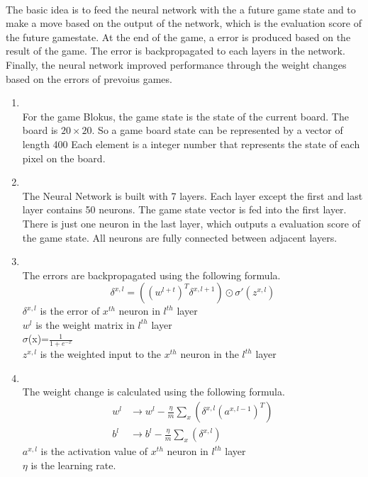 \documentclass{report}
\begin{document}
	\\
	The basic idea is to feed the neural network with the a future game state and to make a move based on the output of the network, which is the evaluation score of the future gamestate.
	At the end of the game, a error is produced based on the result of the game. The error is backpropagated to each layers in the network. Finally, the neural network improved performance through
	the weight changes based on the errors of prevoius games.
	\begin{enumerate}
		\item {}\\
			For the game Blokus, the game state is the state of the current board. The board is $20\times20$. So a game board state can be represented by a vector of length 400
			Each element is a integer number that represents the state of each pixel on the board. 
		\item {}\\
			The Neural Network is built with 7 layers. Each layer except the first and last layer contains 50 neurons. The game state vector is fed into the first layer. There is just one
			neuron in the last layer, which outputs a evaluation score of the game state. All neurons are fully connected between adjacent layers. 
		\item {}\\
			The errors are backpropagated using the following formula.
				\begin{equation*}
				\delta^{x, l} = \left( \left( w^{l+t} \right)^T \delta^{x, l+1} \right) \odot  \sigma'\left( z^{x, l}\right)
				\end{equation*}
			$\delta^{x, l}$  is the error of $x^{th}$ neuron in $l^{th}$ layer\\
			$w^l$  is the weight matrix in $l^{th}$ layer \\
			$\sigma$(x)=$\frac{1}{1+e^{-x}}$ \\
			$z^{x, l}$ is the weighted input to the $x^{th}$ neuron in the $l^{th}$ layer
		\item {}\\
			The weight change is calculated using the following formula.
				\begin{align*}
					w^l &\rightarrow w^l - \frac{\eta}{m} \sum_{x} \left(\delta^{x, l} \left( a^{x, l-1}\right) ^T\right) \\
					b^l &\rightarrow b^l - \frac{\eta}{m} \sum_{x} \left(\delta^{x, l}\right)
				\end{align*}
					$a^{x, l}$  is the activation value of $x^{th}$ neuron in $l^{th}$ layer \\
					$\eta$ is the learning rate.
	\end{enumerate}
\end{document}

